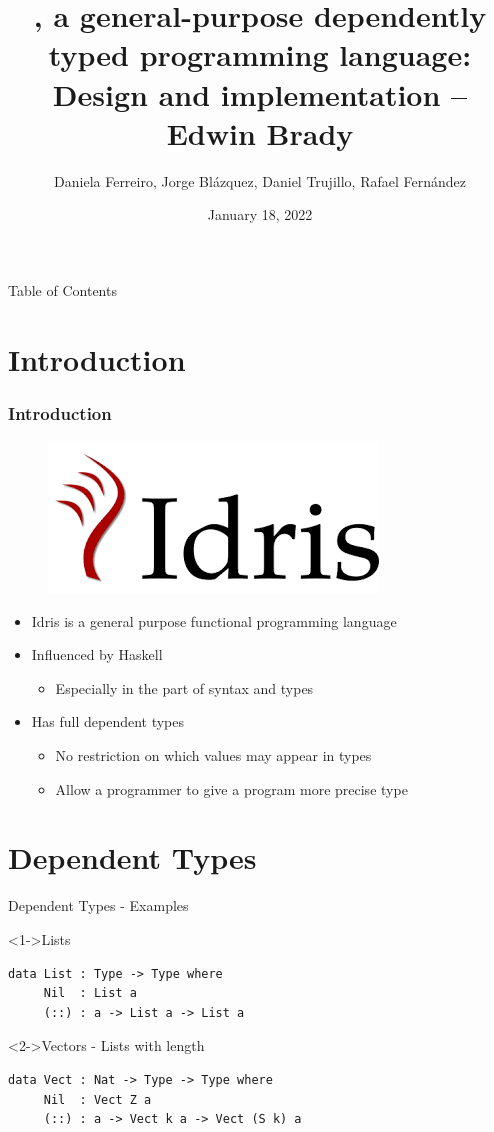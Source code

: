 \documentclass{beamer}
\title{\Idris, a general-purpose dependently typed programming language: Design and implementation -- Edwin Brady}
\author{Daniela Ferreiro, Jorge Blázquez, Daniel Trujillo, Rafael Fernández}
\date{January 18, 2022}
\begin{document}
	
	\frame{\titlepage}
	
	\begin{frame}{Table of Contents}
		\tableofcontents
	\end{frame}
	\newcommand{\intro}{Introduction}
	\section{\intro}
	\label{sec:intro}
	
	\begin{frame}
		\frametitle{\intro}
		\begin{figure}
			\includegraphics[width=0.3\linewidth]{pics/idris.png}
			\label{fig:boat1}
		\end{figure}
		\begin{itemize}
			\setlength\itemsep{1em} 
			\item Idris is a general purpose functional programming language
			
			\item Influenced by Haskell
			\begin{itemize}
				\item Especially in the part of syntax and types
			\end{itemize}   
			\item Has full dependent types
			\begin{itemize}
				\item No restriction on which values may appear in types
				\item Allow a programmer to give a program more precise type
			\end{itemize}   
		\end{itemize}
	\end{frame}
	
	\newcommand{\dependentTypes}{Dependent Types}
	\section{\dependentTypes}
	\label{sec:dependentTypes}
	\begin{frame}[fragile]{Dependent Types - Examples}
		
		\begin{block}<1->{Lists}
			\begin{lstlisting}[basicstyle=\ttfamily\scriptsize]
data List : Type -> Type where
	 Nil  : List a
	 (::) : a -> List a -> List a		
			\end{lstlisting}
		\end{block}
		
		\begin{block}<2->{Vectors - Lists with length}
			\begin{lstlisting}[basicstyle=\ttfamily\scriptsize]
data Vect : Nat -> Type -> Type where
	 Nil  : Vect Z a
	 (::) : a -> Vect k a -> Vect (S k) a	
			\end{lstlisting}
		\end{block}
	\end{frame}
	
\end{document}
